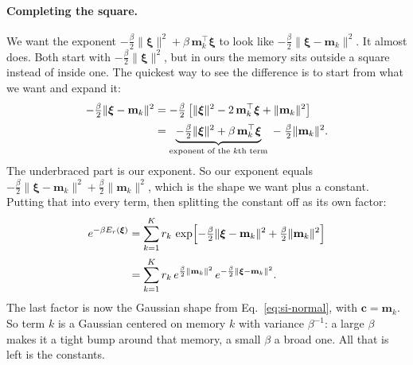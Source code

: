 \paragraph{Completing the square.}
We want the exponent
$-\tfrac\beta2\lVert\boldsymbol{\xi}\rVert^{2}
 + \beta\,\mathbf{m}_k^\top\boldsymbol{\xi}$
to look like $-\tfrac\beta2\lVert\boldsymbol{\xi}-\mathbf{m}_k\rVert^{2}$. It almost
does. Both start with $-\tfrac\beta2\lVert\boldsymbol{\xi}\rVert^{2}$, but in ours
the memory sits outside a square instead of inside one. The quickest way to see the
difference is to start from what we want and expand it:
\begin{align}
  -\tfrac\beta2\lVert\boldsymbol{\xi}-\mathbf{m}_k\rVert^2
  &= -\tfrac\beta2\left[\lVert\boldsymbol{\xi}\rVert^2
     - 2\,\mathbf{m}_k^\top\boldsymbol{\xi}
     + \lVert\mathbf{m}_k\rVert^2\right]
     \notag\\[2pt]
  &= \underbrace{-\tfrac\beta2\lVert\boldsymbol{\xi}\rVert^2
     + \beta\,\mathbf{m}_k^\top\boldsymbol{\xi}}_{\text{exponent of the }k\text{th term}}
     \;-\; \tfrac\beta2\lVert\mathbf{m}_k\rVert^2 .
\end{align}
The underbraced part is our exponent. So our exponent equals
$-\tfrac\beta2\lVert\boldsymbol{\xi}-\mathbf{m}_k\rVert^{2}
 + \tfrac\beta2\lVert\mathbf{m}_k\rVert^{2}$, which is the shape we want plus a
constant. Putting that into every term, then splitting the constant off as its own
factor:
\begin{align}
  e^{-\beta E_r(\boldsymbol{\xi})}
  &= \sum_{k=1}^{K} r_k\,
     \exp\!\left[-\tfrac\beta2\lVert\boldsymbol{\xi}-\mathbf{m}_k\rVert^2
       + \tfrac\beta2\lVert\mathbf{m}_k\rVert^2\right]
     \notag\\[2pt]
  &= \sum_{k=1}^{K} r_k\, e^{\frac\beta2\lVert\mathbf{m}_k\rVert^2}\,
     e^{-\frac\beta2\lVert\boldsymbol{\xi}-\mathbf{m}_k\rVert^2} .
\end{align}
The last factor is now the Gaussian shape from Eq.~\ref{eq:si-normal}, with
$\mathbf{c} = \mathbf{m}_k$. So term $k$ is a Gaussian centered on memory $k$ with
variance $\beta^{-1}$: a large $\beta$ makes it a tight bump around that memory, a
small $\beta$ a broad one. All that is left is the constants.

